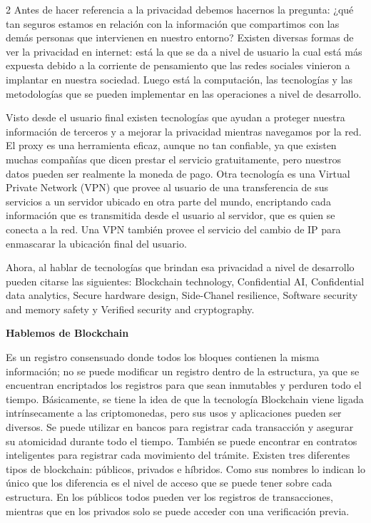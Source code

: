 \documentclass[12pt,spanish,Letterpaper,openany]{book}
\begin{document}
\begin {multicols}{2}
Antes de hacer referencia a la privacidad debemos hacernos la pregunta: ¿qué tan seguros estamos en relación con la información que compartimos con las demás personas que intervienen en nuestro entorno? Existen diversas formas de ver la privacidad en internet: está la que se da a nivel de usuario la cual está más expuesta debido a la corriente de pensamiento que las redes sociales vinieron a implantar en nuestra sociedad. Luego está la computación, las tecnologías y las metodologías que se pueden implementar en las operaciones a nivel de desarrollo.

Visto desde el usuario final existen tecnologías que ayudan a proteger nuestra información de terceros y a mejorar la privacidad mientras navegamos por la red. El proxy es una herramienta eficaz, aunque no tan confiable, ya que existen muchas compañías que dicen prestar el servicio gratuitamente, pero nuestros datos pueden ser realmente la moneda de pago. Otra tecnología es una Virtual Private Network (VPN) que provee al usuario de una transferencia de sus servicios a un servidor ubicado en otra parte del mundo, encriptando cada información que es transmitida desde el usuario al servidor, que es quien se conecta a la red. Una VPN también provee el servicio del cambio de IP para enmascarar la ubicación final del usuario.

Ahora, al hablar de tecnologías que brindan esa privacidad a nivel de desarrollo pueden citarse las siguientes: Blockchain technology, Confidential AI, Confidential data analytics, Secure hardware design, Side-Chanel resilience, Software security and memory safety y Verified security and cryptography.

\textbf{Hablemos de Blockchain}

Es un registro consensuado donde todos los bloques contienen la misma información; no se puede modificar un registro dentro de la estructura, ya que se encuentran encriptados los registros para que sean inmutables y perduren todo el tiempo. Básicamente, se tiene la idea de que la tecnología Blockchain viene ligada intrínsecamente a las criptomonedas, pero sus usos y aplicaciones pueden ser diversos. Se puede utilizar en bancos para registrar cada transacción y asegurar su atomicidad durante todo el tiempo. También se puede encontrar en contratos inteligentes para registrar cada movimiento del trámite. Existen tres diferentes tipos de blockchain: públicos, privados e híbridos. Como sus nombres lo indican lo único que los diferencia es el nivel de acceso que se puede tener sobre cada estructura. En los públicos todos pueden ver los registros de transacciones, mientras que en los privados solo se puede acceder con una verificación previa.


\end{multicols}
\end{document}
